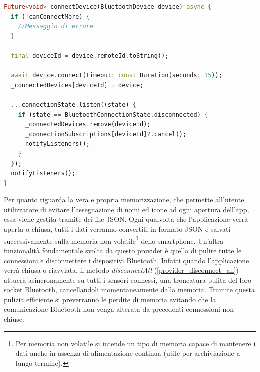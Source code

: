 \documentclass[target=bach,aauheader=,style=]{thud}
\begin{document}
\begin{lstlisting}[language=dart, caption={Connessione al sensore BLE e registrazione del listener.}, label={provider_connect}]
Future<void> connectDevice(BluetoothDevice device) async {
  if (!canConnectMore) {
    //Messaggio di errore
  }

  final deviceId = device.remoteId.toString();
  
  await device.connect(timeout: const Duration(seconds: 15));
  _connectedDevices[deviceId] = device;
  
  ...connectionState.listen((state) {
    if (state == BluetoothConnectionState.disconnected) {
      _connectedDevices.remove(deviceId);
      _connectionSubscriptions[deviceId]?.cancel();
      notifyListeners();
    }
  });
  notifyListeners();
}
\end{lstlisting}
Per quanto riguarda la vera e propria memorizzazione, che permette all'utente utilizzatore di evitare l'assegnazione di nomi ed icone ad ogni apertura dell'app, essa viene gestita tramite dei file JSON. Ogni qualvolta che l'applicazione verrà aperta o chiusa, tutti i dati verranno convertiti in formato JSON e salvati successivamente sulla memoria non volatile\footnote{Per memoria non volatile si intende un tipo di memoria capace di mantenere i dati anche in assenza di alimentazione continua (utile per archiviazione a lungo termine).} dello smartphone. Un'altra funzionalità fondamentale svolta da questo provider è quella di pulire tutte le connessioni e disconnettere i dispositivi Bluetooth. Infatti quando l'applicazione verrà chiusa o riavviata, il metodo \textit{disconnectAll} (\ref{provider_disconnect_all}) attuerà asincronamente su tutti i sensori connessi, una troncatura pulita del loro socket Bluetooth, cancellandoli momentaneamente dalla memoria. Tramite questa pulizia efficiente si preverranno le perdite di memoria evitando che la comunicazione Bluetooth non venga alterata da precedenti connessioni non chiuse. 
\end{document}
